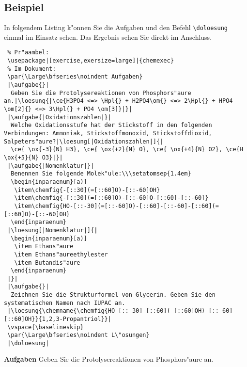 \documentclass[a4paper,10pt,headsepline]{scrartcl}
\begin{document}
\subsection{Beispiel}
In folgendem Listing k"onnen Sie die Aufgaben und den Befehl \texttt{\textbackslash doloesung} einmal im Einsatz sehen. Das Ergebnis sehen Sie direkt im Anschluss.
\begin{lstlisting}
 % Pr"aambel:
 \usepackage|[exercise,exersize=large]|{chemexec}
 % Im Dokument:
 \par{\Large\bfseries\noindent Aufgaben}
 |\aufgabe{}|
  Geben Sie die Protolysereaktionen von Phosphors"aure an.|\loesung{|\ce{H3PO4 <=> \Hpl{} + H2PO4\om{} <=> 2\Hpl{} + HPO4 \om[2]{} <=> 3\Hpl{} + PO4 \om[3]}|}|
 |\aufgabe{|Oxidationszahlen|}|
  Welche Oxidationsstufe hat der Stickstoff in den folgenden Verbindungen: Ammoniak, Stickstoffmonoxid, Stickstoffdioxid, Salpeters"aure?|\loesung[|Oxidationszahlen|]{|
  \ce{ \ox{-3}{N} H3}, \ce{ \ox{+2}{N} O}, \ce{ \ox{+4}{N} O2}, \ce{H \ox{+5}{N} O3}|}|
 |\aufgabe{|Nomenklatur|}|
  Benennen Sie folgende Molek"ule:\\\setatomsep{1.4em}
  \begin{inparaenum}[a)]
   \item\chemfig{-[::30](=[::60]O)-[::-60]OH}
   \item\chemfig{-[::30](=[::60]O)-[::-60]O-[::60]-[::-60]}
   \item\chemfig{HO-[::-30](=[::-60]O)-[::60]-[::-60]-[::60](=[::60]O)-[::-60]OH}
  \end{inparaenum}
 |\loesung[|Nomenklatur|]{|
  \begin{inparaenum}[a)]
   \item Ethans"aure
   \item Ethans"aureethylester
   \item Butandis"aure
  \end{inparaenum}
 |}|
 |\aufgabe{}|
  Zeichnen Sie die Strukturformel von Glycerin. Geben Sie den systematischen Namen nach IUPAC an.
 |\loesung{\chemname{\chemfig{HO-[::-30]-[::60](-[::60]OH)-[::-60]-[::60]OH}}{1,2,3-Propantriol}}|
 \vspace{\baselineskip}
 \par{\Large\bfseries\noindent L\"osungen}
 |\doloesung|
\end{lstlisting}
\par{\Large\bfseries\noindent Aufgaben}
\aufgabe{}
 Geben Sie die Protolysereaktionen von Phosphors"aure an.
\end{document}
